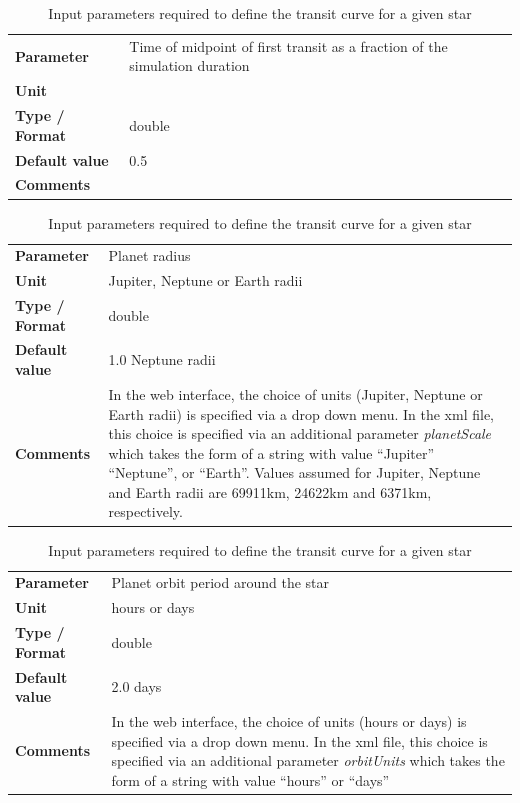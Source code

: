 \documentclass[11pt]{article}      %
\def\HCode#1{}
\def\htmlanchor#1{\HCode{<a id="#1"></a>}}
\begin{document}
\begin{table}[hb]
  \caption{Input parameters required to define the transit curve for a given star}

  \htmlanchor{firstTransitTime}
  \begin{tabular}{| l | p{13cm} |}
    \hline 
    {\bf Parameter} & Time of midpoint of first transit as a fraction of the simulation duration\\
    {\bf Unit} & \\
    {\bf Type / Format} & double\\
    {\bf Default value} & 0.5\\
    {\bf Comments} & \\
    \hline
  \end{tabular}
  \bigskip

  \htmlanchor{planetRadius}
  \begin{tabular}{| l | p{13cm} |}
    \hline 
    {\bf Parameter} & Planet radius\\
    {\bf Unit} & Jupiter, Neptune or Earth radii\\
    {\bf Type / Format} & double\\
    {\bf Default value} & 1.0 Neptune radii\\
    {\bf Comments} & In the web interface, the choice of units (Jupiter, Neptune or Earth radii) is specified via a drop down menu.  In the xml file, this choice is specified via an additional parameter {\it planetScale} which takes the form of a string with value ``Jupiter'' ``Neptune'', or ``Earth''. Values assumed for Jupiter, Neptune and Earth radii are 69911km, 24622km and 6371km, respectively.\\
    \hline
  \end{tabular}
  \bigskip

  \htmlanchor{orbitPeriod}
  \begin{tabular}{| l | p{13cm} |}
    \hline 
    {\bf Parameter} & Planet orbit period around the star\\
    {\bf Unit} & hours or days\\
    {\bf Type / Format} & double\\
    {\bf Default value} & 2.0 days\\
    {\bf Comments} & In the web interface, the choice of units (hours or days) is specified via a drop down menu.  In the xml file, this choice is specified via an additional parameter {\it orbitUnits} which takes the form of a string with value ``hours'' or ``days''\\
    \hline
  \end{tabular}
  \bigskip


\end{table}
\end{document}
